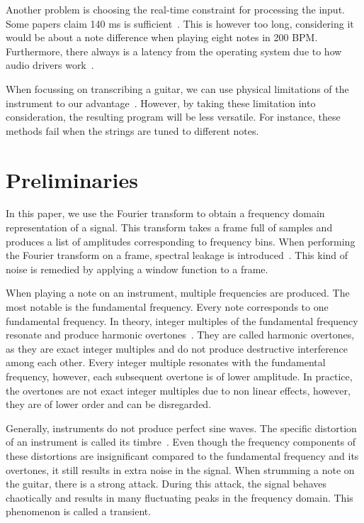 \documentclass[10pt,twocolumn]{article}
\begin{document}
Another problem is choosing the real-time constraint for processing the input. Some papers claim 140 ms is sufficient~\cite{sloomboi}. This is however too long, considering it would be about a note difference when playing eight notes in 200 BPM. Furthermore, there always is a latency from the operating system due to how audio drivers work~\cite{os}.  %

When focussing on transcribing a guitar, we can use physical limitations of the instrument to our advantage~\cite{physical}. However, by taking these limitation into consideration, the resulting program will be less versatile. For instance, these methods fail when the strings are tuned to different notes.


\section{Preliminaries}
In this paper, we use the Fourier transform to obtain a frequency domain representation of a signal. This transform takes a frame full of samples and produces a list of amplitudes corresponding to frequency bins. When performing the Fourier transform on a frame, spectral leakage is introduced~\cite{spectral}. This kind of noise is remedied by applying a window function to a frame. %

When playing a note on an instrument, multiple frequencies are produced. The most notable is the fundamental frequency. Every note corresponds to one fundamental frequency. In theory, integer multiples of the fundamental frequency resonate and produce harmonic overtones~\cite{overtones}. They are called harmonic overtones, as they are exact integer multiples and do not produce destructive interference among each other. Every integer multiple resonates with the fundamental frequency, however, each subsequent overtone is of lower amplitude. In practice, the overtones are not exact integer multiples due to non linear effects, however, they are of lower order and can be disregarded.  %

Generally, instruments do not produce perfect sine waves. The specific distortion of an instrument is called its timbre~\cite{timbre}. Even though the frequency components of these distortions are insignificant compared to the fundamental frequency and its overtones, it still results in extra noise in the signal. When strumming a note on the guitar, there is a strong attack. During this attack, the signal behaves chaotically and results in many fluctuating peaks in the frequency domain. This phenomenon is called a transient.
\end{document}
